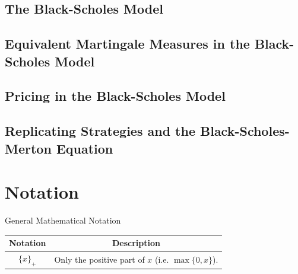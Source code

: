 \documentclass[11pt,a4paper]{article}
\begin{document}
\subsection{The Black-Scholes Model}

\subsection{Equivalent Martingale Measures in the Black-Scholes Model}

\subsection{Pricing in the Black-Scholes Model}

\subsection{Replicating Strategies and the Black-Scholes-Merton Equation}

\section{Notation}

  \begin{notation}{General Mathematical Notation}
    \begin{tabular}{c|c}
      Notation&Description\\\hline
      $\{x\}_+$&Only the positive part of $x$ (i.e. $\max\{0,x\}$).
    \end{tabular}
  \end{notation}
\end{document}
